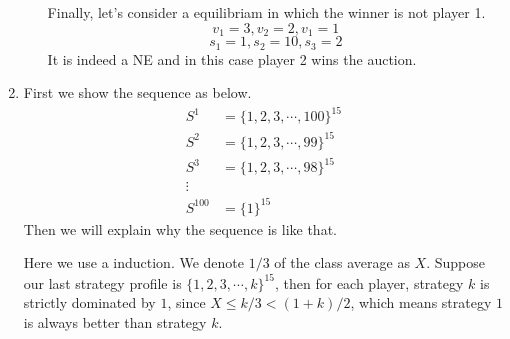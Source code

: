 \documentclass[12pt]{cgtmd}
\begin{document}
\begin{enumerate}
\begin{enumerate}
                Finally, let's consider a equilibriam in which the winner is not player 1. 
                $$v_1 = 3, v_2 = 2, v_1 = 1$$
                $$s_1 = 1, s_2 = 10, s_3 = 2$$
                It is indeed a NE and in this case player 2 wins the auction.

        \end{enumerate}
    \item First we show the sequence as below.
        \begin{align*}
            S^1 &= \{1, 2, 3, \cdots, 100\}^{15}\\
            S^2 &= \{1, 2, 3, \cdots, 99\}^{15}\\
            S^3 &= \{1, 2, 3, \cdots, 98\}^{15}\\
            \vdots\\
            S^{100} &= \{1\}^{15}
        \end{align*}
        Then we will explain why the sequence is like that. 

        Here we use a induction. We denote $1/3$ of the class average as $X$. Suppose our last strategy profile is $\{1, 2, 3, \cdots, k\}^{15}$, then for each player, strategy $k$ is strictly dominated by $1$, since $X \leq k / 3 < (1 + k) / 2$, which means strategy $1$ is always better than strategy $k$. 
\end{enumerate}
\end{document}
